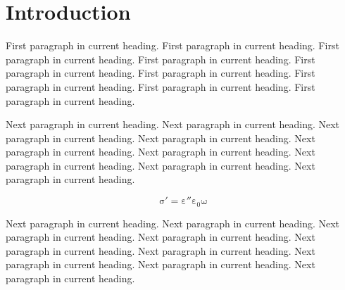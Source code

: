 \chapter{Introduction}

%
%
%
%
%

\noindent   %
First paragraph in current heading. First paragraph in current heading.
First paragraph in current heading. First paragraph in current heading.
First paragraph in current heading. First paragraph in current heading.
First paragraph in current heading. First paragraph in current heading.
First paragraph in current heading.\cite{article-one}

%
%
%

Next paragraph in current heading. Next paragraph in current heading.
Next paragraph in current heading. Next paragraph in current heading.
Next paragraph in current heading. Next paragraph in current heading.
Next paragraph in current heading. Next paragraph in current heading.
Next paragraph in current heading.\cite{article-many,book-knownauthor,book-unknownauthor}

\begin{equation}
\mathrm{\sigma ' = \varepsilon '' \varepsilon _{0} \omega}
\label{eq:sample}
\end{equation}

Next paragraph in current heading. Next paragraph in current heading.
Next paragraph in current heading. Next paragraph in current heading.
Next paragraph in current heading. Next paragraph in current heading.
Next paragraph in current heading. Next paragraph in current heading.
Next paragraph in current heading.

%
%


